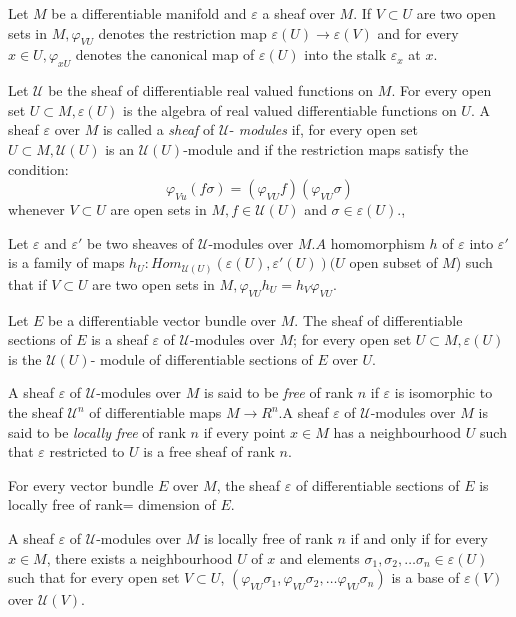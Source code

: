 Let $M$ be a differentiable manifold and $\varepsilon$ a sheaf over $M$. 
If $V \subset U$ are two open sets in $M, \varphi_{VU}$ denotes the
restriction map $\varepsilon (U) \to \varepsilon(V)$ and for every $x
\in U, \varphi_{x U}$ denotes the canonical map of $\varepsilon(U)$
into the stalk $\varepsilon_x$ at $x$. 

Let $\mathscr{U}$ be the sheaf of differentiable real valued functions
on $M$. For every open set $U \subset M, \varepsilon (U)$ is the
algebra of real valued differentiable functions on $U$. A sheaf
$\varepsilon$ over $M$ is called a \textit{ sheaf } of
$\mathscr{U}$-\textit{ modules} if, for every open set $U \subset M,
\mathscr{U} (U)$ is an $\mathscr{U}(U)$-module and if the restriction
maps satisfy the condition: 
$$
\varphi_{Vu}(f \sigma) = (\varphi_{VU}f) (\varphi_{VU} \sigma)
$$
whenever $V \subset U$ are open sets in $M, f \in \mathscr{U} (U)$ and
$\sigma \in \varepsilon (U)$., 

Let $\varepsilon$ and $\varepsilon'$ be two sheaves of
$\mathscr{U}$-modules over $M.A$ homomorphism $h$ of $\varepsilon$
into $\varepsilon'$ is a family of maps $h_U:
Hom_{\mathscr{U}(U)}(\varepsilon(U) , \varepsilon'(U)) (U$ open subset
of $M$) such that if $V \subset U$ are two open sets in $M, \varphi
_{VU} h_U = h_V  \varphi_{VU}$. 

Let $E$ be a differentiable vector bundle over $M$. The sheaf of
differentiable sections of $E$ is a sheaf $\varepsilon$ of
$\mathscr{U}$-modules over $M$; for every open set $U \subset M,
\varepsilon (U)$ is the $\mathscr{U}(U)$- module of differentiable
sections of $E$ over $U$. 

\begin{defn}\label{chap5:sec4:def2}%
  A sheaf $\varepsilon$ of $\mathscr{U}$-modules over $M$ is said to
  be \textit{ free } of rank $n$ if $\varepsilon$ is isomorphic to the
  sheaf $\mathscr{U}^n$ of differentiable maps $M \to R^n$.\pageoriginale A sheaf
  $\varepsilon$ of $\mathscr{U}$-modules over $M$ is said to be
  \textit{ locally free } of rank $n$ if every point $x \in M$ has a
  neighbourhood $U$ such that $\varepsilon$ restricted to $U$ is a
  free sheaf of rank $n$. 
\end{defn}

For every vector bundle $E$ over $M$, the sheaf $\varepsilon$ of
differentiable sections of $E$ is locally free of rank= dimension of
$E$. 

\begin{proposition}\label{chap5:sec4:prop2}%
  A sheaf $\varepsilon$ of $\mathscr{U}$-modules over $M$ is locally
  free of rank $n$ if and only if for every $x \in M$, there exists a
  neighbourhood $U$ of $x$ and elements $\sigma_1, \sigma_2, \ldots
  \sigma_n \in \varepsilon (U)$ such that for every open set $V
  \subset U$, $(\varphi_{VU} \sigma_1, \varphi_{VU} \sigma_2, \ldots
  \varphi_{VU} \sigma_n)$ is 
  a base of $\varepsilon(V)$ over $\mathscr{U}(V)$. 
\end{proposition}

